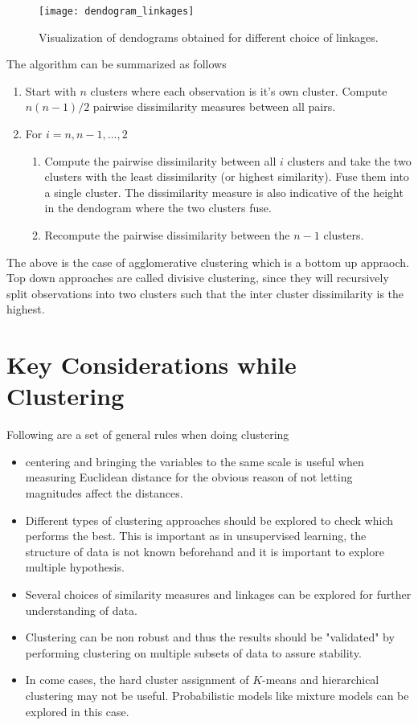 \documentclass[../statistical_learning_notes.tex]{subfiles}
\begin{document}
    \begin{figure}[h]
    \texttt{[image: dendogram\_linkages]}
    \centering
    \caption{Visualization of dendograms obtained for different choice of linkages.}
    \label{fig:dendogram_linkages} %
    \end{figure}

    The algorithm can be summarized as follows
    \begin{enumerate}
        \item Start with $n$ clusters where each observation is it's own cluster. Compute $n(n-1)/2$ pairwise dissimilarity measures between all pairs.
        \item For $i=n, n-1, \ldots, 2$
        \begin{enumerate}
            \item Compute the pairwise dissimilarity between all $i$ clusters and take the two clusters with the least dissimilarity (or highest similarity). Fuse them into a single cluster. The dissimilarity measure is also indicative of the height in the dendogram where the two clusters fuse.
            \item Recompute the pairwise dissimilarity between the $n-1$ clusters.
        \end{enumerate}
    \end{enumerate}

    The above is the case of agglomerative clustering which is a bottom up appraoch. Top down approaches are called divisive clustering, since they will recursively split observations into two clusters such that the inter cluster dissimilarity is the highest.


    \section{Key Considerations while Clustering}
    Following are a set of general rules when doing clustering
    \begin{itemize}
        \item centering and bringing the variables to the same scale is useful when measuring Euclidean distance for the obvious reason of not letting magnitudes affect the distances.
        \item Different types of clustering approaches should be explored to check which performs the best. This is important as in unsupervised learning, the structure of data is not known beforehand and it is important to explore multiple hypothesis.
        \item Several choices of similarity measures and linkages can be explored for further understanding of data.
        \item Clustering can be non robust and thus the results should be "validated" by performing clustering on multiple subsets of data to assure stability.
        \item In come cases, the hard cluster assignment of $K$-means and hierarchical clustering may not be useful. Probabilistic models like mixture models can be explored in this case.
    \end{itemize}
\end{document}
